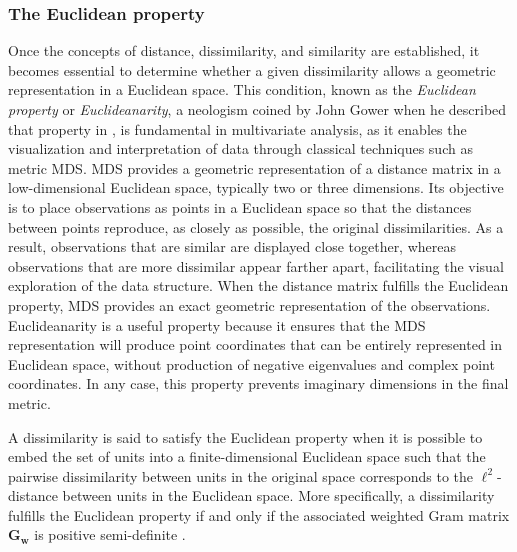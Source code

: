 \subsubsection{The Euclidean property}
\label{sec:Euclidean}
Once the concepts of distance, dissimilarity, and similarity are established, it becomes essential to determine whether a given dissimilarity allows a geometric representation in a Euclidean space. This condition, known as the \emph{Euclidean property} or \emph{Euclideanarity}, a neologism coined by John Gower when he described that property in \cite{gower1986metric}, is fundamental in multivariate analysis, as it enables the visualization and interpretation of data through classical techniques such as metric MDS. MDS provides a geometric representation of a distance matrix in a low-dimensional Euclidean space, typically two or three dimensions. Its objective is to place observations as points in a Euclidean space so that the distances between points reproduce, as closely as possible, the original dissimilarities. As a result, observations that are similar are displayed close together, whereas observations that are more dissimilar appear farther apart, facilitating the visual exploration of the data structure. When the distance matrix fulfills the Euclidean property, MDS provides an exact geometric representation of the observations.
Euclideanarity is a useful property because it ensures that the MDS representation will produce point coordinates that can be entirely represented in Euclidean space, without production of negative eigenvalues and complex point coordinates. In any case, this property prevents imaginary dimensions in the final metric.

A dissimilarity is said to satisfy the Euclidean property when it is possible to embed the set of units into a finite-dimensional Euclidean space such that the pairwise dissimilarity between units in the original space corresponds to the $\ell^2$-distance between units in the Euclidean space. More specifically, a dissimilarity fulfills the Euclidean property if and only if the associated weighted Gram matrix $\mathbf{G_w}$ is positive semi-definite \citep{boj2010distance}. 

